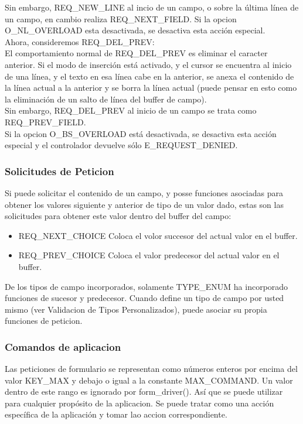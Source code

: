 \documentclass{article}
\begin{document}
Sin embargo, REQ\_NEW\_LINE al incio de un campo, o sobre la última línea de un
campo, en cambio realiza REQ\_NEXT\_FIELD. Si la opcion O\_NL\_OVERLOAD esta
desactivada, se desactiva esta acción especial.\\

Ahora, consideremos REQ\_DEL\_PREV:\\

El comportamiento normal de REQ\_DEL\_PREV es eliminar el caracter anterior. Si
el modo de inserción está activado, y el cursor se encuentra al inicio de una
línea, y el texto en esa línea cabe en la anterior, se anexa el contenido de la
línea actual a la anterior y se borra la línea actual (puede pensar en esto
como la eliminación de un salto de línea del buffer de campo).\\

Sin embargo, REQ\_DEL\_PREV al inicio de un campo se trata como REQ\_PREV\_FIELD.\\

Si la opcion O\_BS\_OVERLOAD está desactivada, se desactiva esta acción especial
y el controlador devuelve sólo E\_REQUEST\_DENIED.

\subsubsection{Solicitudes de Peticion}%
Si puede solicitar el contenido de un campo, y posse funciones asociadas para
obtener los valores siguiente y anterior de tipo de un valor dado, estas son
las solicitudes para obtener este valor dentro del buffer del campo:

\begin{itemize}
  \item REQ\_NEXT\_CHOICE Coloca el volor succesor del actual valor en el buffer.
  \item REQ\_PREV\_CHOICE Coloca el valor predecesor del actual valor en el buffer.
\end{itemize}

De los tipos de campo incorporados, solamente TYPE\_ENUM ha incorporado
funciones de sucesor y predecesor. Cuando define un tipo de campo por usted
mismo (ver Validacion de Tipos Personalizados), puede asociar su propia
funciones de peticion.

\subsubsection{Comandos de aplicacion}%
Las peticiones de formulario se representan como números enteros por encima del
valor KEY\_MAX y debajo o igual a la constante MAX\_COMMAND. Un valor dentro de
este rango es ignorado por form\_driver(). Así que se puede utilizar para
cualquier propósito de la aplicacion. Se puede tratar como una acción
específica de la aplicación y tomar lao accion correspondiente.
\end{document}

